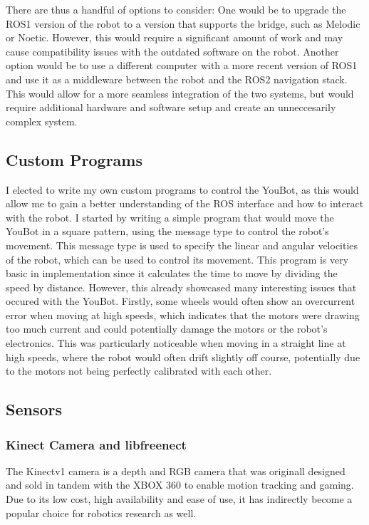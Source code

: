 \documentclass[a4paper, 12pt]{article}
\newcommand{\code}[1]{\texttt{\detokenize{#1}}}
\begin{document}
    There are thus a handful of options to consider: One would be to upgrade the ROS1 version of the robot to a version that supports the bridge, such as Melodic or Noetic. However, this would require a significant amount of work and may cause compatibility issues with the outdated software on the robot. Another option would be to use a different computer with a more recent version of ROS1 and use it as a middleware between the robot and the ROS2 navigation stack. This would allow for a more seamless integration of the two systems, but would require additional hardware and software setup and create an unneccesarily complex system. 

    \subsection{Custom Programs}

    I elected to write my own custom programs to control the YouBot, as this would allow me to gain a better understanding of the ROS interface and how to interact with the robot. I started by writing a simple program that would move the YouBot in a square pattern, using the \code{geometry_msgs/Twist} message type to control the robot's movement. This message type is used to specify the linear and angular velocities of the robot, which can be used to control its movement. This program is very basic in implementation since it calculates the time to move by dividing the speed by distance. However, this already showcased many interesting issues that occured with the YouBot. Firstly, some wheels would often show an overcurrent error when moving at high speeds, which indicates that the motors were drawing too much current and could potentially damage the motors or the robot's electronics. This was particularly noticeable when moving in a straight line at high speeds, where the robot would often drift slightly off course, potentially due to the motors not being perfectly calibrated with each other. 


    

    
    \subsection{Sensors}
    \subsubsection{Kinect Camera and libfreenect}

    The Kinectv1 camera is a depth and RGB camera that was originall designed and sold in tandem with the XBOX 360 to enable motion tracking and gaming. Due to its low cost, high availability and ease of use, it has indirectly become a popular choice for robotics research as well. 
\end{document}
